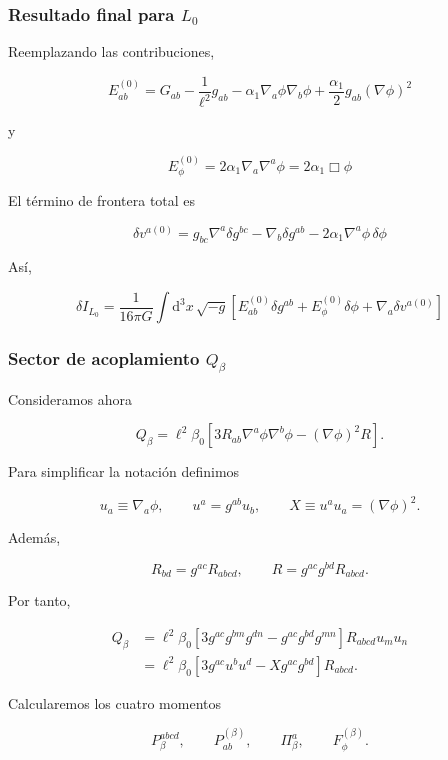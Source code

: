 \documentclass{beamer}
\renewcommand{\dd}{\mathrm{d}}
\newcommand{\CompactDisplaySpacing}{%
  \setlength{\abovedisplayskip}{2pt plus 1pt minus 1pt}%
  \setlength{\belowdisplayskip}{2pt plus 1pt minus 1pt}%
  \setlength{\abovedisplayshortskip}{0pt plus 1pt}%
  \setlength{\belowdisplayshortskip}{1pt plus 1pt}%
}
\begin{document}
\begin{frame}[label=nav-frame-097]
\frametitle{Resultado final para \(L_0\)}
\small

Reemplazando las contribuciones,

\begin{equation}
\boxed{
E^{(0)}_{ab}
=
G_{ab}
-\frac{1}{\ell^2}g_{ab}
-\alpha_1\nabla_a\phi\nabla_b\phi
+
\frac{\alpha_1}{2}
g_{ab}(\nabla\phi)^2
}
\label{eq:Eab-h0}
\end{equation}

y

\begin{equation}
\boxed{
E^{(0)}_\phi
=
2\alpha_1\nabla_a\nabla^a\phi
=
2\alpha_1\Box\phi
}
\label{eq:Ephi-h0}
\end{equation}

El término de frontera total es

\begin{equation}
\boxed{
\delta v^{a(0)}
=
g_{bc}\nabla^a\delta g^{bc}
-
\nabla_b\delta g^{ab}
-
2\alpha_1\nabla^a\phi\,\delta\phi
}
\label{eq:frontera-h0}
\end{equation}

Así,

\[
\boxed{
\delta I_{L_0}
=
\frac{1}{16\pi G}
\int\dd^3x\,\sqrt{-g}
\left[
E^{(0)}_{ab}\delta g^{ab}
+
E^{(0)}_\phi\delta\phi
+
\nabla_a\delta v^{a(0)}
\right]
}
\]

\end{frame}


\begin{frame}[label=nav-frame-098]
\frametitle{Sector de acoplamiento \(Q_\beta\)}
\small
\CompactDisplaySpacing

Consideramos ahora

\[
\boxed{
Q_\beta
=
\ell^2\beta_0
\left[
3R_{ab}\nabla^a\phi\nabla^b\phi
-
(\nabla\phi)^2R
\right].
}
\]

Para simplificar la notación definimos

\[
u_a\equiv\nabla_a\phi,
\qquad
u^a=g^{ab}u_b,
\qquad
X\equiv u^a u_a=(\nabla\phi)^2.
\]

Además,

\[
R_{bd}=g^{ac}R_{abcd},
\qquad
R=g^{ac}g^{bd}R_{abcd}.
\]

Por tanto,

\begin{align*}
Q_\beta
&=
\ell^2\beta_0
\left[
3g^{ac}g^{bm}g^{dn}
-
g^{ac}g^{bd}g^{mn}
\right]
R_{abcd}u_m u_n
\\[1mm]
&=
\ell^2\beta_0
\left[
3g^{ac}u^bu^d
-
Xg^{ac}g^{bd}
\right]R_{abcd}.
\end{align*}

Calcularemos los cuatro momentos

\[
P_\beta^{abcd},
\qquad
P^{(\beta)}_{ab},
\qquad
\Pi_\beta^a,
\qquad
F_\phi^{(\beta)}.
\]

\end{frame}
\end{document}
